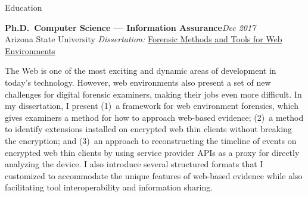 

\begin{rSection}{Education}

\textbf{Ph.D.\ Computer Science --- Information Assurance}\hfill \emph{Dec 2017}\\%
Arizona State University\iftoggle{showGPA}{ | GPA 3.76}{} \hfill %
\iftoggle{fullAddress}{{1151 S Forest Ave \#140, Tempe, AZ 85281}\\}{{Tempe, AZ}\\}
\textit{Dissertation:} \href{https://mikemabey.com/Dissertation_Mabey.pdf}{Forensic Methods and Tools for Web
Environments}
\begin{CVonly}\begin{quoting}

  The Web is one of the most exciting and dynamic areas of development in today's technology. However, web environments
  also present a set of new challenges for digital forensic examiners, making their jobs even more difficult. In my
  dissertation, I present (1)~a framework for web environment forensics, which gives examiners a method for how to
  approach web-based evidence; (2)~a method to identify extensions installed on encrypted web thin clients without
  breaking the encryption; and (3)~an approach to reconstructing the timeline of events on encrypted web thin clients by
  using service provider APIs as a proxy for directly analyzing the device. I also introduce several structured formats
  that I customized to accommodate the unique features of web-based evidence while also facilitating tool
  interoperability and information sharing.

\end{quoting}\end{CVonly}


\end{rSection}
